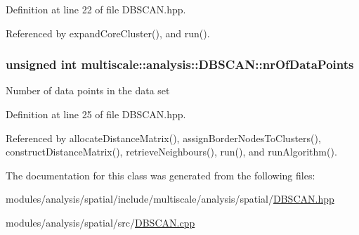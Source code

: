 Definition at line 22 of file D\-B\-S\-C\-A\-N.\-hpp.



Referenced by expand\-Core\-Cluster(), and run().

\hypertarget{classmultiscale_1_1analysis_1_1DBSCAN_af81a42ca24493494b3d20e27c76be016}{
\subsubsection[{nr\-Of\-Data\-Points}]{\setlength{\rightskip}{0pt plus 5cm}unsigned int multiscale\-::analysis\-::\-D\-B\-S\-C\-A\-N\-::nr\-Of\-Data\-Points\hspace{0.3cm}{\ttfamily [private]}}}\label{classmultiscale_1_1analysis_1_1DBSCAN_af81a42ca24493494b3d20e27c76be016}
Number of data points in the data set 

Definition at line 25 of file D\-B\-S\-C\-A\-N.\-hpp.



Referenced by allocate\-Distance\-Matrix(), assign\-Border\-Nodes\-To\-Clusters(), construct\-Distance\-Matrix(), retrieve\-Neighbours(), run(), and run\-Algorithm().



The documentation for this class was generated from the following files\-:\begin{DoxyCompactItemize}
\item 
modules/analysis/spatial/include/multiscale/analysis/spatial/\hyperlink{DBSCAN_8hpp}{D\-B\-S\-C\-A\-N.\-hpp}\item 
modules/analysis/spatial/src/\hyperlink{DBSCAN_8cpp}{D\-B\-S\-C\-A\-N.\-cpp}\end{DoxyCompactItemize}
